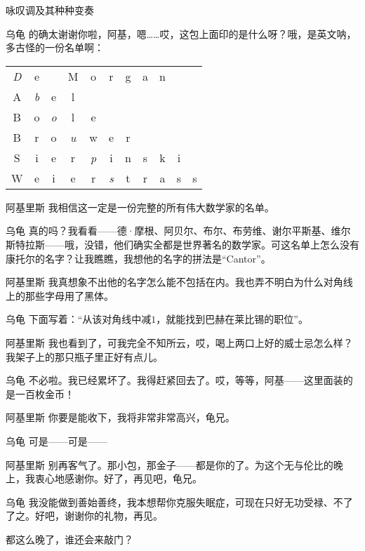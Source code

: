 \begin{dialog}{咏叹调及其种种变奏}
\begin{dialogue}
\item[乌龟]的确太谢谢你啦，阿基，嗯……哎，这包上面印的是什么呀？哦，是英文呐，多古怪的一份名单啊：
\begin{center}
\setlength\tabcolsep{1pt}
\begin{tabular}{*{11}c}
\emph{D}&e&&M&o&r&g&a&n\\
A&\emph{b}&e&l\\
B&o&\emph{o}&l&e\\
B&r&o&\emph{u}&w&e&r\\
S&i&e&r&\emph{p}&i&n&s&k&i\\
W&e&i&e&r&\emph{s}&t&r&a&s&s
\end{tabular}
\end{center}
\item[阿基里斯]我相信这一定是一份完整的所有伟大数学家的名单。

\item[乌龟]真的吗？我看看——德·摩根、阿贝尔、布尔、布劳维、谢尔平斯基、维尔斯特拉斯——哦，没错，他们确实全都是世界著名的数学家。可这名单上怎么没有康托尔的名字？让我瞧瞧，我想他的名字的拼法是“Cantor”。

\item[阿基里斯]我真想象不出他的名字怎么能不包括在内。我也弄不明白为什么对角线上的那些字母用了黑体。

\item[乌龟]下面写着：“从该对角线中减$1$，就能找到巴赫在莱比锡的职位”。

\item[阿基里斯]我也看到了，可我完全不知所云，哎，喝上两口上好的威士忌怎么样？我架子上的那只瓶子里正好有点儿。

\item[乌龟]不必啦。我已经累坏了。我得赶紧回去了。哎，等等，阿基——这里面装的是一百枚金币！

\item[阿基里斯]你要是能收下，我将非常非常高兴，龟兄。

\item[乌龟]可是——可是——

\item[阿基里斯]别再客气了。那小包，那金子——都是你的了。为这个无与伦比的晚上，我衷心地感谢你。好了，再见吧，龟兄。

\item[乌龟]我没能做到善始善终，我本想帮你克服失眠症，可现在只好无功受禄、不了了之。好吧，谢谢你的礼物，再见。


都这么晚了，谁还会来敲门？


\end{dialogue}
\end{dialog}
